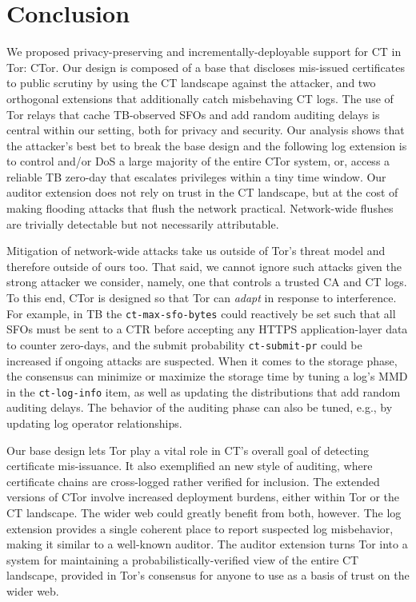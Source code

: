 \section{Conclusion} \label{sec:conclusion}
We proposed privacy-preserving and incrementally-deployable support for CT in
Tor: CTor.  Our design is composed of a base that discloses mis-issued
certificates to public scrutiny by using the CT landscape against the attacker,
and two orthogonal extensions that additionally catch misbehaving CT logs.  The
use of Tor relays that cache TB-observed SFOs and add random auditing delays is
central within our setting, both for privacy and security.  Our analysis shows
that the attacker's best bet to break the base design and the following log
extension is to control and/or DoS a large majority of the entire CTor system,
or, access a reliable TB zero-day that escalates privileges within a tiny time
window.  Our auditor extension does not rely on trust in the CT landscape, but
at the cost of making flooding attacks that flush the network practical.
Network-wide flushes are trivially detectable but not necessarily attributable.

Mitigation of network-wide attacks take us outside of Tor's threat model and
therefore outside of ours too.  That said, we cannot ignore such attacks given
the strong attacker we consider, namely, one that controls a trusted CA and
CT logs.  To this end, CTor is designed so that Tor can \emph{adapt} in response
to interference.  For example, in TB the \texttt{ct-max-sfo-bytes} could
reactively be set such that all SFOs must be sent to a CTR before accepting any
HTTPS application-layer data to counter zero-days, and the submit probability
\texttt{ct-submit-pr} could be increased if ongoing attacks are suspected.  When
it comes to the storage phase, the consensus can minimize or maximize the
storage time by tuning a log's MMD in the \texttt{ct-log-info} item, as well as
updating the distributions that add random auditing delays.  The behavior of the
auditing phase can also be tuned, e.g., by updating log operator relationships.

Our base design lets Tor play a vital role in CT's overall goal of detecting
certificate mis-issuance.  It also exemplified an new style of auditing, where
certificate chains are cross-logged rather verified for inclusion.  The extended
versions of CTor involve increased deployment burdens, either within Tor or the
CT landscape.  The wider web could greatly benefit from both, however.  The log
extension provides a single coherent place to report suspected log misbehavior,
making it similar to a well-known auditor.  The auditor extension turns Tor into
a system for maintaining a probabilistically-verified view of the entire CT
landscape, provided in Tor's consensus for anyone to use as a basis of trust on
the wider web.
